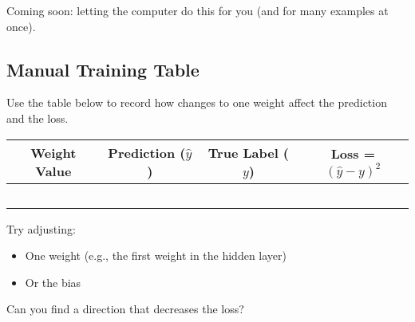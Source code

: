 \documentclass{book}
\begin{document}
\noindent Coming soon: letting the computer do this for you (and for many examples at once).

\subsection*{Manual Training Table}

Use the table below to record how changes to one weight affect the prediction and the loss.

\bigskip

\begin{tabular}{|c|c|c|c|}
\hline
Weight Value & Prediction ($\hat{y}$) & True Label ($y$) & Loss = $(\hat{y} - y)^2$ \\
\hline
 & & & \\
\hline
 & & & \\
\hline
 & & & \\
\hline
 & & & \\
\hline
 & & & \\
\hline
\end{tabular}

\bigskip

Try adjusting:
\begin{itemize}
  \item One weight (e.g., the first weight in the hidden layer)
  \item Or the bias
\end{itemize}

Can you find a direction that decreases the loss?
\end{document}
